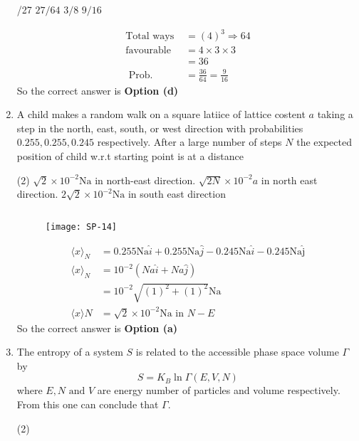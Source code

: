 \begin{enumerate}
\begin{tasks}
		/27
		\task[\textbf{b.}]$27 / 64$
		\task[\textbf{c.}]$3 / 8$
		\task[\textbf{d.}]$9 / 16$ 
	\end{tasks}
	\begin{answer}
		\begin{align*}
		\text{Total ways }&=(4)^{3} \Rightarrow 64\\
		\text{favourable }&=4 \times 3 \times 3\\
		&=36\\
		\text { Prob. }&=\frac{36}{64}=\frac{9}{16}
		\end{align*}
		So the correct answer is \textbf{Option (d)}
	\end{answer}
	\item A child makes a random walk on a square latiice of lattice costent $a$ taking a step in the north, east, south, or west direction with probabilities $0.255,0.255,0.245$ respectively. After a large number of steps $N$ the expected position of child w.r.t starting point is at a distance
	 \begin{tasks}(2)
		\task[\textbf{a.}]$\sqrt{2} \times 10^{-2} \mathrm{Na}$ in north-east direction.
		\task[\textbf{b.}]$\sqrt{2 N} \times 10^{-2} a$  in north east direction.
		\task[\textbf{c.}]$2 \sqrt{2} \times 10^{-2} \mathrm{Na}$ in south east direction
	\end{tasks}
	\begin{answer}$\left. \right. $
		\begin{figure}[H]
			\centering
			\texttt{[image: SP-14]}
		\end{figure}
		\begin{align*}
\langle x\rangle_{N}&=0.255 \mathrm{Na}\hat{i}
+0.255 \mathrm{Na} \hat{j}-0.245 \mathrm{Na} \hat{i}
-0.245 \mathrm{Na\hat{j}}\\
\langle x\rangle_{N}&=10^{-2}(Na \hat{i}+Na \hat { j })\\
&=10^{-2} \sqrt{(1)^{2}+(1)^{2}} \mathrm{Na}\\
\langle x\rangle N&=\sqrt{2} \times 10^{-2} \mathrm{Na} \text { in } N-E
		\end{align*}
		So the correct answer is \textbf{Option (a)}
	\end{answer}
	\item The entropy of a system $S$ is related to the accessible phase space volume $\Gamma$ by 
	$$S=K_{B} \ln \Gamma(E, V, N)$$
	where $E,N \text{ and }V$ are energy number of particles and volume respectively. From this one can conclude that $\Gamma$.
	 \begin{tasks}(2)

\end{tasks}
\end{enumerate}

